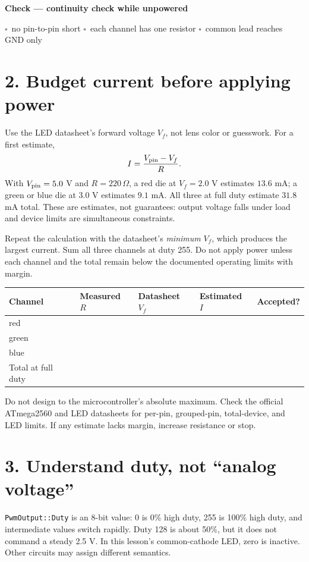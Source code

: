 \documentclass[11pt]{article}
\newcommand{\checkbox}{\(\square\)}
\newenvironment{checkpoint}[1]
{\begin{center}\begin{minipage}{0.94\linewidth}\textbf{Check --- #1}\par}
{\end{minipage}\end{center}}
\begin{document}
\begin{checkpoint}{continuity check while unpowered}
\checkbox\ no pin-to-pin short \quad \checkbox\ each channel has one resistor
\quad \checkbox\ common lead reaches GND only
\end{checkpoint}

\section*{2. Budget current before applying power}

Use the LED datasheet's forward voltage \(V_f\), not lens color or guesswork.
For a first estimate,
\[
I=\frac{V_{\rm pin}-V_f}{R}.
\]
With \(V_{\rm pin}=5.0\) V and \(R=220\,\Omega\), a red die at
\(V_f=2.0\) V estimates \(13.6\) mA; a green or blue die at \(3.0\) V
estimates \(9.1\) mA. All three at full duty estimate \(31.8\) mA total.
These are estimates, not guarantees: output voltage falls under load and
device limits are simultaneous constraints.

Repeat the calculation with the datasheet's \emph{minimum} \(V_f\), which
produces the largest current. Sum all three channels at duty 255. Do not apply
power unless each channel and the total remain below the documented operating
limits with margin.

\begin{center}
\begin{tabularx}{0.9\linewidth}{@{}lXXXX@{}}
\toprule
Channel & Measured \(R\) & Datasheet \(V_f\) & Estimated \(I\) & Accepted?\\
\midrule
red   & & & & \\
green & & & & \\
blue  & & & & \\
\midrule
Total at full duty & & & & \\
\bottomrule
\end{tabularx}
\end{center}

Do not design to the microcontroller's absolute maximum. Check the official
ATmega2560 and LED datasheets for per-pin, grouped-pin, total-device, and LED
limits. If any estimate lacks margin, increase resistance or stop.

\section*{3. Understand duty, not ``analog voltage''}

\texttt{PwmOutput::Duty} is an 8-bit value: 0 is 0\% high duty, 255 is
100\% high duty, and intermediate values switch rapidly. Duty 128 is about
50\%, but it does not command a steady 2.5 V. In this lesson's common-cathode
LED, zero is inactive. Other circuits may assign different semantics.
\end{document}
